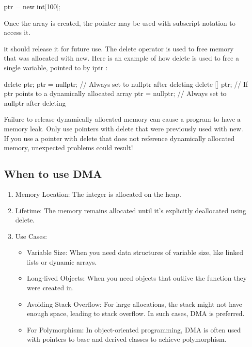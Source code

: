 \documentclass{report}
\begin{document}
\begin{cppcode}
ptr = new int[100];
\end{cppcode}

\bigbreak \noindent 
    Once the array is created, the pointer may be used with subscript notation to access it. 

    \bigbreak \noindent 
     it should
release it for future use. The delete operator is used to free memory that was allocated
with new. Here is an example of how delete is used to free a single variable, pointed to
by iptr :
    \bigbreak \noindent 
    
    \begin{cppcode}
delete ptr;
ptr = nullptr; // Always set to nullptr after deleting
delete [] ptr; // If ptr points to a dynamically allocated array
ptr = nullptr; // Always set to nullptr after deleting
    \end{cppcode}
    
    \bigbreak \noindent 
    \begin{notebox}
			Failure to release dynamically allocated memory can cause a program to have a memory leak. Only use pointers with delete that were previously used with new. If you use a pointer with delete that does not reference dynamically allocated memory, unexpected problems could result!
		\end{notebox}
    \bigbreak \noindent 

    \bigbreak \noindent 
    \subsection{When to use DMA}
    \bigbreak \noindent 
    \begin{enumerate}
        \item Memory Location: The integer is allocated on the heap.
        \item Lifetime: The memory remains allocated until it's explicitly deallocated using delete.
        \item Use Cases:
        \begin{itemize}
            \item Variable Size: When you need data structures of variable size, like linked lists or dynamic arrays.
            \item Long-lived Objects: When you need objects that outlive the function they were created in.
            \item Avoiding Stack Overflow: For large allocations, the stack might not have enough space, leading to stack overflow. In such cases, DMA is preferred.
            \item For Polymorphism: In object-oriented programming, DMA is often used with pointers to base and derived classes to achieve polymorphism.
        \end{itemize}
    \end{enumerate}
\end{document}
